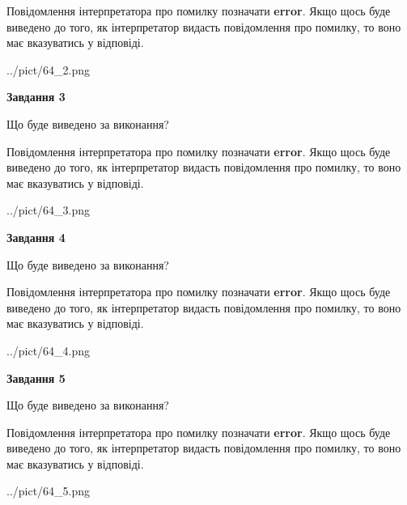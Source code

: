 \documentclass[12pt, ukrainian]{article}
\begin{document}
{\begin {large}
Повідомлення інтерпретатора про помилку позначати \textbf{error}.
Якщо щось буде виведено до того, як інтерпретатор видасть повідомлення про помилку, 
то воно має вказуватись у відповіді. \par


\begin{center}
	{../pict/64_2.png}
\end{center}
\newpage

{\begin {center}\textbf{Завдання 3}\end {center}}\par
Що буде виведено за виконання?

Повідомлення інтерпретатора про помилку позначати \textbf{error}.
Якщо щось буде виведено до того, як інтерпретатор видасть повідомлення про помилку, 
то воно має вказуватись у відповіді. \par


\begin{center}
	{../pict/64_3.png}
\end{center}
\newpage

{\begin {center}\textbf{Завдання 4}\end {center}}\par
Що буде виведено за виконання?

Повідомлення інтерпретатора про помилку позначати \textbf{error}.
Якщо щось буде виведено до того, як інтерпретатор видасть повідомлення про помилку, 
то воно має вказуватись у відповіді. \par


\begin{center}
	{../pict/64_4.png}
\end{center}
\newpage

{\begin {center}\textbf{Завдання 5}\end {center}}\par
Що буде виведено за виконання?

Повідомлення інтерпретатора про помилку позначати \textbf{error}.
Якщо щось буде виведено до того, як інтерпретатор видасть повідомлення про помилку, 
то воно має вказуватись у відповіді. \par


\begin{center}
	{../pict/64_5.png}
\end{center}
\newpage


\end{large}}
\end{document}

